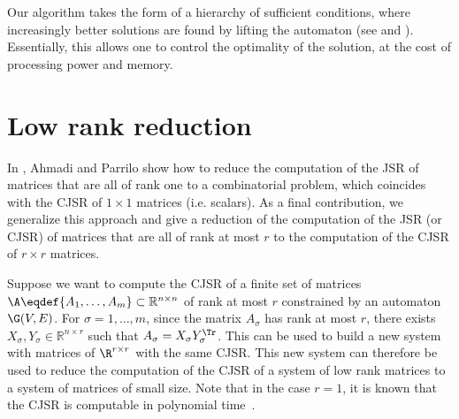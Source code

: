 \documentclass[11pt,twoside,a4paper,openright]{uclouvain-thesis}
\begin{document}
Our algorithm takes the form of a hierarchy of sufficient conditions,
where increasingly better solutions are found by lifting the automaton (see  and ).
Essentially, this allows one to control the optimality of the solution, at the cost of processing power and memory.




\section{Low rank reduction}
\label{sec:lowrank}

In \cite{ahmadi2012joint}, Ahmadi and Parrilo show how to reduce the computation of the JSR
of matrices that are all of rank one to a combinatorial problem,
which coincides with the CJSR of $1 \times 1$ matrices (i.e. scalars).
As a final contribution, we generalize
this approach and give a reduction of the computation of the JSR (or CJSR)
of matrices that are all of rank at most $r$ to the computation of the CJSR of $r \times r$ matrices.

Suppose we want to compute the CJSR of a finite set of matrices $\A \eqdef \{A_1, \ldots, A_m\} \subset \mathbb{R}^{n \times n}$ of rank at most $r$ constrained by an automaton $\G(V,E)$.
For $\sigma = 1, \ldots, m$, since the matrix $A_\sigma$ has rank at most $r$, there exists $X_\sigma, Y_\sigma \in \mathbb{R}^{n \times r}$ such that $A_\sigma = X_\sigma Y_\sigma^\Tr$.
This can be used to build a new system with matrices of $\R^{r \times r}$ with the same CJSR.
This new system can therefore be used to reduce the computation of the CJSR of a system of low rank matrices to a system of matrices of small size.
Note that in the case $r=1$, it is known that the CJSR is computable in polynomial time~\cite{ahmadi2012joint}.
\end{document}
